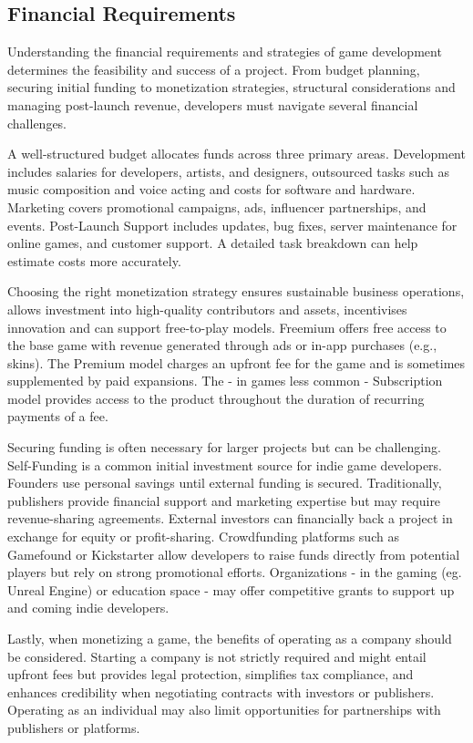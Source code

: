 \subsection{Financial Requirements}
Understanding the financial requirements and strategies of game development determines the feasibility and success of a project. From budget planning, securing initial funding to monetization strategies, structural considerations and managing post-launch revenue, developers must navigate several financial challenges.

A well-structured budget allocates funds across three primary areas. Development includes salaries for developers, artists, and designers, outsourced tasks such as music composition and voice acting and costs for software and hardware. Marketing covers promotional campaigns, ads, influencer partnerships, and events. Post-Launch Support includes updates, bug fixes, server maintenance for online games, and customer support. A detailed task breakdown can help estimate costs more accurately.

Choosing the right monetization strategy ensures sustainable business operations, allows investment into high-quality contributors and assets, incentivises innovation and can support free-to-play models. Freemium offers free access to the base game with revenue generated through ads or in-app purchases (e.g., skins). The Premium model charges an upfront fee for the game and is sometimes supplemented by paid expansions. The - in games less common - Subscription model provides access to the product throughout the duration of recurring payments of a fee. 

Securing funding is often necessary for larger projects but can be challenging. Self-Funding is a common initial investment source for indie game developers. Founders use personal savings until external funding is secured. Traditionally, publishers provide financial support and marketing expertise but may require revenue-sharing agreements. External investors can financially back a project in exchange for equity or profit-sharing. Crowdfunding platforms such as Gamefound or Kickstarter allow developers to raise funds directly from potential players but rely on strong promotional efforts. Organizations - in the gaming (eg. Unreal Engine) or education space - may offer competitive grants to support up and coming indie developers.

Lastly, when monetizing a game, the benefits of operating as a company should be considered. Starting a company is not strictly required and might entail upfront fees but provides legal protection, simplifies tax compliance, and enhances credibility when negotiating contracts with investors or publishers. Operating as an individual may also limit opportunities for partnerships with publishers or platforms.
